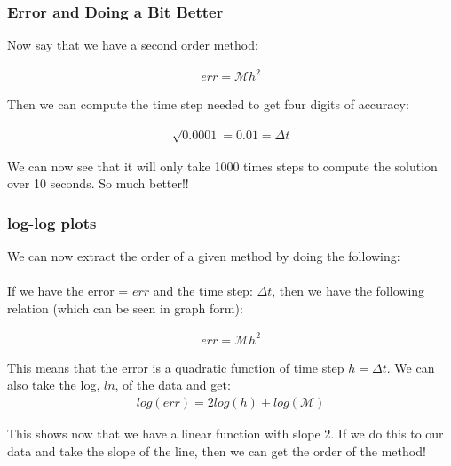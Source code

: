 \documentclass{beamer}
\begin{document}
\begin{frame}
\frametitle{Error and Doing a Bit Better} 

Now say that we have a second order method: 

\begin{align*}
err = \mathcal{M}h^2
\end{align*}

Then we can compute the time step needed to get four digits of accuracy: 

\begin{align*}
\sqrt{0.0001} = 0.01 = \Delta t
\end{align*}

We can now see that it will only take 1000 times steps to compute the solution over 10 seconds. So much better!! 
 
\end{frame}
%
\begin{frame}
\frametitle{log-log plots} 

We can now extract the order of a given method by doing the following: \\
\ \\
If we have the error = $err$ and the time step: $\Delta t$, then we have the following relation (which can be seen in graph form): 

\begin{align*}
err = \mathcal{M}h^2
\end{align*}

This means that the error is a quadratic function of time step $h = \Delta t$. We can also take the log, $ln$, of the data and get: 
\begin{align*}
log(err) = 2log(h) + log(\mathcal{M})
\end{align*}

This shows now that we have a linear function with slope 2. If we do this to our data and take the slope of the line, then we can get the order of the method! 

 
\end{frame}

\end{document}
